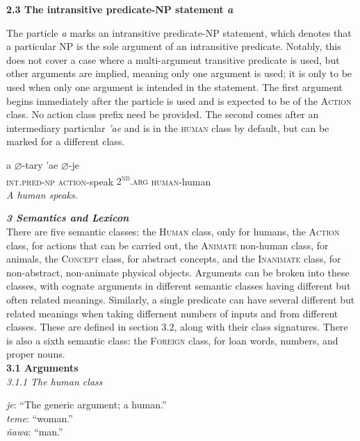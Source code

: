 \documentclass{article}[10pt]
\newcommand{\defarg}[2]{\emph{#1}: ``#2.''\\}
\begin{document}
{\bf 2.3 The intransitive predicate-NP statement \emph{a}}

The particle \emph{a} marks an intransitive predicate-NP statement, which denotes that a particular NP is the sole argument of an intransitive predicate. Notably, this does not cover a case where a multi-argument transitive predicate is used, but other arguments are implied, meaning only one argument is used; it is only to be used when only one argument is intended in the statement. The first argument begins immediately after the particle is used and is expected to be of the \textsc{Action} class. No action class prefix need be provided. The second comes after an intermediary particular \emph{'ae} and is in the \textsc{human} class by default, but can be marked for a different class.\\ 

\begin{exe}
\ex
\gll a $\varnothing$-tary 'ae $\varnothing$-je\\
\textsc{int.pred-np} \textsc{action}-speak \textsc{2\textsuperscript{nd}.arg} \textsc{human}-human\\
\trans \emph{A human speaks.}
\end{exe}

\clearpage
{\bf \emph{3 Semantics and Lexicon}}\\

There are five semantic classes: the \textsc{Human} class, only for humans, the \textsc{Action} class, for actions that can be carried out, the \textsc{Animate} non-human class, for animals, the \textsc{Concept} class, for abstract concepts, and the \textsc{Inanimate} class, for non-abstract, non-animate physical objects. Arguments can be broken into these classes, with cognate arguments in different semantic classes having different but often related meanings. Similarly, a single predicate can have several different but related meanings when taking differnent numbers of inputs and from different classes. These are defined in section 3.2, along with their class signatures. There is also a sixth semantic class: the \textsc{Foreign} class, for loan words, numbers, and proper nouns.\\

{\bf 3.1 Arguments}\\

\emph{3.1.1 The human class}
\begin{multicols}{3}
\noindent
\defarg{je}{The generic argument; a human}
\defarg{teme}{woman}
\defarg{\~{n}awa}{man}
\end{multicols}
\end{document}
